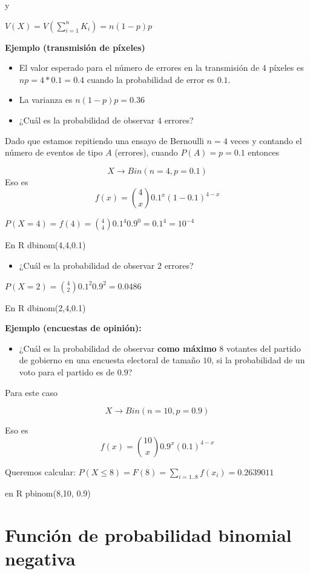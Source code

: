 \documentclass[
]{book}
\providecommand{\tightlist}{%
  \setlength{\itemsep}{0pt}\setlength{\parskip}{0pt}}
\begin{document}
y

\(V(X)=V(\sum_{i=1}^n K_i)=n(1-p)p\)

\textbf{Ejemplo (transmisión de píxeles)}

\begin{itemize}
\item
  El valor esperado para el número de errores en la transmisión de \(4\) píxeles es \(np=4*0.1=0.4\) cuando la probabilidad de error es \(0.1\).
\item
  La varianza es \(n(1-p)p=0.36\)
\item
  ¿Cuál es la probabilidad de observar \(4\) errores?
\end{itemize}

Dado que estamos repitiendo una ensayo de Bernoulli \(n=4\) veces y contando el número de eventos de tipo \(A\) (errores), cuando \(P(A)=p=0.1\) entonces

\[X \rightarrow Bin(n=4, p=0.1)\]
Eso es \[f(x)=\binom 4 x 0.1^x(1-0.1)^{4-x}\]

\(P(X=4)=f(4)=\binom 4 4 0.1^4 0.9^{0}=0.1^4=10^{-4}\)

En R dbinom(4,4,0.1)

\begin{itemize}
\tightlist
\item
  ¿Cuál es la probabilidad de observar \(2\) errores?
\end{itemize}

\(P(X=2)=\binom 4 2 0.1^2 0.9^2=0.0486\)

En R dbinom(2,4,0.1)

\textbf{Ejemplo (encuestas de opinión):}

\begin{itemize}
\tightlist
\item
  ¿Cuál es la probabilidad de observar \textbf{como máximo} \(8\) votantes del partido de gobierno en una encuesta electoral de tamaño \(10\), si la probabilidad de un voto para el partido es de \(0.9\)?
\end{itemize}

Para este caso

\[X \rightarrow Bin(n=10, p=0.9)\]

Eso es \[f(x)=\binom {10} x 0.9^x(0.1)^{4-x}\]

Queremos calcular:
\(P(X\le 8)=F(8)= \sum_{i=1..8} f(x_i)=0.2639011\)

en R pbinom(8,10, 0.9)

\hypertarget{funciuxf3n-de-probabilidad-binomial-negativa}{%
\section{Función de probabilidad binomial negativa}\label{funciuxf3n-de-probabilidad-binomial-negativa}}
\end{document}
